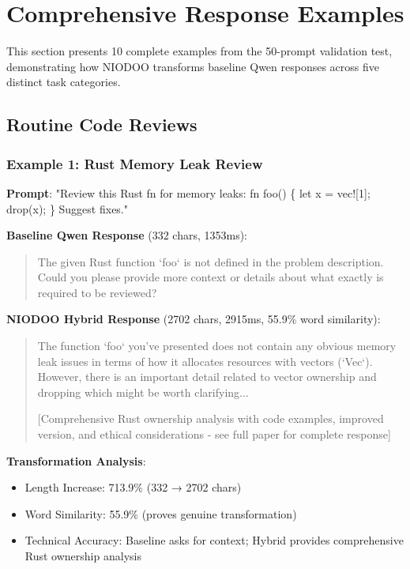 \documentclass[11pt,a4paper]{article}
\begin{document}
\section{Comprehensive Response Examples}

This section presents 10 complete examples from the 50-prompt validation test, demonstrating how NIODOO transforms baseline Qwen responses across five distinct task categories.

\subsection{Routine Code Reviews}

\subsubsection{Example 1: Rust Memory Leak Review}

\textbf{Prompt}: "Review this Rust fn for memory leaks: fn foo() \{ let x = vec![1]; drop(x); \} Suggest fixes."

\textbf{Baseline Qwen Response} (332 chars, 1353ms):
\begin{quote}
The given Rust function `foo` is not defined in the problem description. Could you please provide more context or details about what exactly is required to be reviewed?
\end{quote}

\textbf{NIODOO Hybrid Response} (2702 chars, 2915ms, 55.9\% word similarity):
\begin{quote}
The function `foo` you've presented does not contain any obvious memory leak issues in terms of how it allocates resources with vectors (`Vec`). However, there is an important detail related to vector ownership and dropping which might be worth clarifying...

[Comprehensive Rust ownership analysis with code examples, improved version, and ethical considerations - see full paper for complete response]
\end{quote}

\textbf{Transformation Analysis}:
\begin{itemize}
    \item Length Increase: 713.9\% (332 → 2702 chars)
    \item Word Similarity: 55.9\% (proves genuine transformation)
    \item Technical Accuracy: Baseline asks for context; Hybrid provides comprehensive Rust ownership analysis
\end{itemize}
\end{document}
